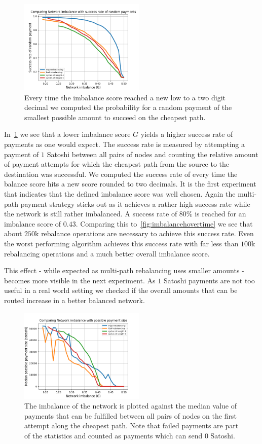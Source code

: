 \documentclass[conference]{IEEEtran}
\begin{document}
\begin{figure}
 \centering
 \includegraphics[width=6cm]{code/vs/fig/imba_vs_success_rates.png}
 \caption{Every time the imbalance score reached a new low to a two digit decimal we computed the probability for a random payment of the smallest possible amount to succeed on the cheapest path.}
 \label{fig:imba_vs_success}
\end{figure}

In~\cref{fig:imba_vs_success} we see that a lower imbalance score $G$ yields a higher success rate of payments as one would expect.
The success rate is measured by attempting a payment of $1$ Satoshi between all pairs of nodes and counting the relative amount of payment attempts for which the cheapest path from the source to the destination was successful.
We computed the success rate of every time the balance score hits a new score rounded to two decimals.
It is the first experiment that indicates that the defined imbalance score was well chosen. 
Again the multi-path payment strategy sticks out as it achieves a rather high success rate while the network is still rather imbalanced.
A success rate of $80\%$ is reached for an imbalance score of $0.43$.
Comparing this to~\cref{fig:imbalancehovertime} we see that about $250$k rebalance operations are necessary to achieve this success rate.
Even the worst performing algorithm achieves this success rate with far less than $100$k rebalancing operations and a much better overall imbalance score. 

This effect - while expected as multi-path rebalancing uses smaller amounts - becomes more visible in the next experiment.
As $1$ Satoshi payments are not too useful in a real world setting we checked if the overall amounts that can be routed increase in a better balanced network.

\begin{figure}
 \centering
 \includegraphics[width=6cm]{code/vs/fig/imba_vs_median_payment_size.png}
 \caption{The imbalance of the network is plotted against the median value of payments that can be fulfilled between all pairs of nodes on the first attempt along the cheapest path. Note that failed payments are part of the statistics and counted as payments which can send $0$ Satoshi.}
 \label{fig:imba_vs_payment_size}
\end{figure}
\end{document}
